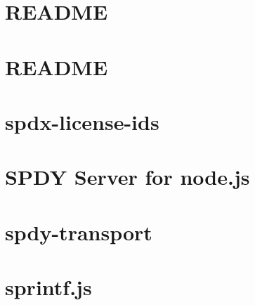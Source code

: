 \documentclass[twoside]{book}
\newcommand{\+}{\discretionary{\mbox{\scriptsize$\hookleftarrow$}}{}{}}
\begin{document}
\chapter{R\+E\+A\+D\+ME}
\label{md__c_1_workspace_demo_src_main_script_node_modules_spdx-correct__r_e_a_d_m_e}

\chapter{R\+E\+A\+D\+ME}
\label{md__c_1_workspace_demo_src_main_script_node_modules_spdx-expression-parse__r_e_a_d_m_e}

\chapter{spdx-\/license-\/ids}
\label{md__c_1_workspace_demo_src_main_script_node_modules_spdx-license-ids__r_e_a_d_m_e}

\chapter{S\+P\+DY Server for node.\+js}
\label{md__c_1_workspace_demo_src_main_script_node_modules_spdy__r_e_a_d_m_e}

\chapter{spdy-\/transport}
\label{md__c_1_workspace_demo_src_main_script_node_modules_spdy-transport__r_e_a_d_m_e}

\chapter{sprintf.\+js}
\label{md__c_1_workspace_demo_src_main_script_node_modules_sprintf-js__r_e_a_d_m_e}

\end{document}
